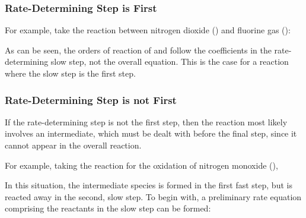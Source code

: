 			\subsubsection{Rate-Determining Step is First}

				For example, take the reaction between nitrogen dioxide () and fluorine gas ():


				As can be seen, the orders of reaction of  and  follow the coefficients in the rate-determining slow
				step, not the overall equation. This is the case for a reaction where the slow step is the first step.



			\subsubsection{Rate-Determining Step is not First}

				If the rate-determining step is not the first step, then the reaction most likely involves an intermediate, which must be
				dealt with before the final step, since it cannot appear in the overall reaction.

				For example, taking the reaction for the oxidation of nitrogen monoxide (),


				\pagebreak
				In this situation, the intermediate species  is formed in the first fast step, but is reacted away in the second,
				slow step. To begin with, a preliminary rate equation comprising the reactants in the slow step can be formed:

